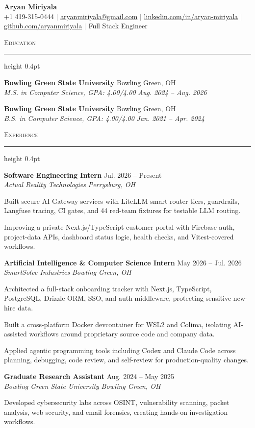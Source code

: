 \documentclass[letterpaper,11pt]{article}
\newcommand{\resumesection}[1]{%
  \par\vspace{2pt}%
  {\large\scshape #1}\par\vspace{2pt}%
  \hrule height 0.4pt\vspace{2pt}%
}
\newcommand{\resumeSubheading}[4]{
  \textbf{#1} \hfill #2\\
  \textit{#3} \hfill \textit{#4}
}
\begin{document}
\begin{center}
  {\LARGE \textbf{Aryan Miriyala}}\\[-1pt]
  \small
  +1 419-315-0444 $|$
  \href{mailto:aryanmiriyala@gmail.com}{aryanmiriyala@gmail.com} $|$
  \href{https://www.linkedin.com/in/aryan-miriyala-7788a21b6/}{linkedin.com/in/aryan-miriyala} $|$
  \href{https://github.com/aryanmiriyala}{github.com/aryanmiriyala} $|$
  Full Stack Engineer
\end{center}\vspace{-10pt}

\resumesection{Education}
\resumeSubheading
{Bowling Green State University}{Bowling Green, OH}
{M.S. in Computer Science, GPA: 4.00/4.00}{Aug. 2024 -- Aug. 2026}

\resumeSubheading
{Bowling Green State University}{Bowling Green, OH}
{B.S. in Computer Science, GPA: 4.00/4.00}{Jan. 2021 -- Apr. 2024}

\resumesection{Experience}
\resumeSubheading
{Software Engineering Intern}{Jul. 2026 -- Present}
{Actual Reality Technologies}{Perrysburg, OH}
\begin{tightitemize}
  \item Built secure AI Gateway services with LiteLLM smart-router tiers, guardrails, Langfuse tracing, CI gates, and 44 red-team fixtures for testable LLM routing.
  \item Improving a private Next.js/TypeScript customer portal with Firebase auth, project-data APIs, dashboard status logic, health checks, and Vitest-covered workflows.
\end{tightitemize}

\resumeSubheading
{Artificial Intelligence \& Computer Science Intern}{May 2026 -- Jul. 2026}
{SmartSolve Industries}{Bowling Green, OH}
\begin{tightitemize}
  \item Architected a full-stack onboarding tracker with Next.js, TypeScript, PostgreSQL, Drizzle ORM, SSO, and auth middleware, protecting sensitive new-hire data.
  \item Built a cross-platform Docker devcontainer for WSL2 and Colima, isolating AI-assisted workflows around proprietary source code and company data.
  \item Applied agentic programming tools including Codex and Claude Code across planning, debugging, code review, and self-review for production-quality changes.
\end{tightitemize}

\resumeSubheading
{Graduate Research Assistant}{Aug. 2024 -- May 2025}
{Bowling Green State University}{Bowling Green, OH}
\begin{tightitemize}
  \item Developed cybersecurity labs across OSINT, vulnerability scanning, packet analysis, web security, and email forensics, creating hands-on investigation workflows.
\end{tightitemize}
\end{document}
